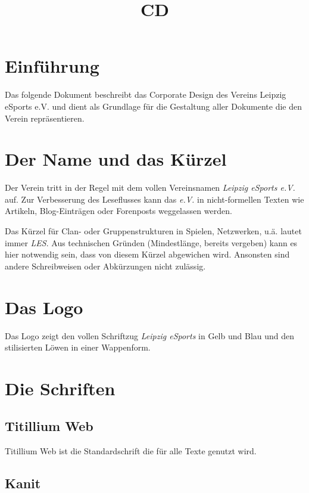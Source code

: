 \documentclass{article}
\begin{document}
\title{CD}

\tableofcontents

\cleardoublepage
\section{Einführung}

Das folgende Dokument beschreibt das Corporate Design des Vereins Leipzig eSports e.V. und dient als Grundlage für die Gestaltung aller Dokumente die den Verein repräsentieren.

\cleardoublepage
\section{Der Name und das Kürzel}

Der Verein tritt in der Regel mit dem vollen Vereinsnamen \emph{Leipzig eSports e.V.} auf. Zur Verbesserung des Leseflusses kann das \emph{e.V.} in nicht-formellen Texten wie Artikeln, Blog-Einträgen oder Forenposts weggelassen werden.

Das Kürzel für Clan- oder Gruppenstrukturen in Spielen, Netzwerken, u.ä. lautet immer \emph{LES}. Aus technischen Gründen (Mindestlänge, bereits vergeben) kann es hier notwendig sein, dass von diesem Kürzel abgewichen wird. Ansonsten sind andere Schreibweisen oder Abkürzungen nicht zulässig.

\section{Das Logo}

Das Logo zeigt den vollen Schriftzug \emph{Leipzig eSports} in Gelb und Blau und den stilisierten Löwen in einer Wappenform.

\section{Die Schriften}

\subsection{Titillium Web}

Titillium Web ist die Standardschrift die für alle Texte genutzt wird.

\subsection{Kanit}
\end{document}
